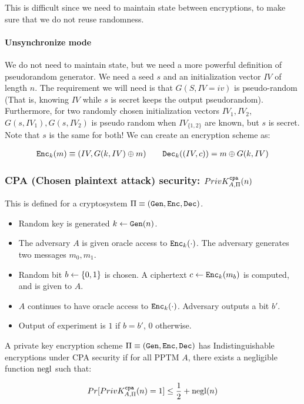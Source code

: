 This is difficult since we need to maintain state between encryptions, to make
sure that we do not reuse randomness.

\paragraph{Unsynchronize mode} We do not need to maintain state, but we
need a more powerful definition of pseudorandom generator. We need a 
seed $s$ and an initialization vector $IV$ of length $n$. The requirement
we will need is that $G(S, IV=iv)$ is pseudo-random (That is, knowing $IV$
while $s$ is secret keeps the output pseudorandom). Furthermore, for two
randomly chosen initialization vectors $IV_1, IV_2$, $G(s, IV_1), G(s, IV_2)$
is pseudo random when $IV_{\{1, 2\}}$ are known, but $s$ is secret. Note that
$s$ is the same for both! We can create an encryption scheme as:

\begin{align*}
    \texttt{Enc}_k(m) \equiv (IV, G(k, IV) \oplus m) \qquad
    \texttt{Dec}_k((IV, c)) = m \oplus G(k, IV)
\end{align*}

\subsubsection{CPA (Chosen plaintext attack) security: $PrivK_{A, \Pi}^{\texttt{cpa}}(n)$}
This is defined for a cryptosystem $\Pi \equiv (\texttt{Gen}, \texttt{Enc}, \texttt{Dec})$.
\begin{itemize}
    \item Random key is generated $k \leftarrow \texttt{Gen}(n)$.
    \item The adversary $A$ is given oracle access to $\texttt{Enc}_k(\cdot)$. The
        adversary generates two messages $m_0, m_1$.
    \item Random bit $b \leftarrow \{0, 1\}$ is chosen. A ciphertext
        $c \leftarrow \texttt{Enc}_k(m_b)$ is computed, and is given to $A$.
    \item $A$ continues to have oracle access to $\texttt{Enc}_k(\cdot)$. Adversary
        outputs a bit $b'$.
    \item Output of experiment is $1$ if $b = b'$, $0$ otherwise.
\end{itemize}

A private key encryption scheme $\Pi \equiv (\texttt{Gen}, \texttt{Enc}, \texttt{Dec})$ has 
Indistinguishable encryptions under CPA  security  if for all PPTM $A$, there
exists a negligible function $\operatorname{negl}$ such that:

\begin{align*}
    Pr[PrivK_{A, \Pi}^{\texttt{cpa}}(n) = 1] \leq \frac{1}{2} + \operatorname{negl}(n)
\end{align*}


